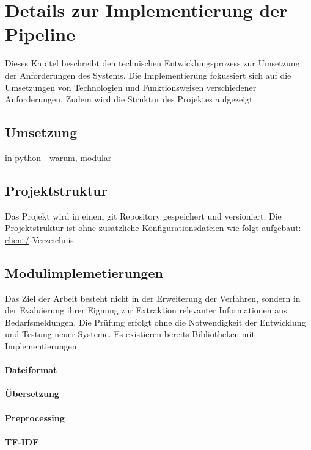 \section{Details zur Implementierung der Pipeline}
Dieses Kapitel beschreibt den technischen Entwicklungsprozess zur Umsetzung der Anforderungen des Systems. Die Implementierung fokussiert sich auf die Umsetzungen von Technologien und Funktionsweisen verschiedener Anforderungen. Zudem wird die Struktur des Projektes aufgezeigt.
\subsection{Umsetzung}
in python - warum, modular
\subsection{Projektstruktur}
Das Projekt wird in einem git Repository gespeichert und versioniert. Die Projektstruktur ist ohne zusätzliche Konfigurationsdateien wie folgt aufgebaut:
\url{client/}-Verzeichnis

\subsection{Modulimplemetierungen}
Das Ziel der Arbeit besteht nicht in der Erweiterung der Verfahren, sondern in der Evaluierung ihrer Eignung zur Extraktion relevanter Informationen aus Bedarfsmeldungen. Die Prüfung erfolgt ohne die Notwendigkeit der Entwicklung und Testung neuer Systeme. Es existieren bereits Bibliotheken mit Implementierungen.
\paragraph{Dateiformat}

\paragraph{Übersetzung}

\paragraph{Preprocessing}

\paragraph{TF-IDF}


